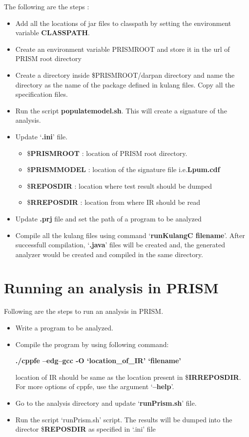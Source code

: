 \documentclass[11pt,a4paper,openright]{report}
\begin{document}
The following are the steps :
\begin{itemize}
 \item  Add all the locations of jar files to classpath by setting the environment variable \textbf{CLASSPATH}. 
 \item Create an environment variable PRISMROOT and store it in the url of PRISM root directory
 \item Create a directory inside \$PRISMROOT/darpan directory and name the directory as the name of the package defined in kulang 
 files. Copy all the specification files.
 \item Run the script \textbf{populatemodel.sh}. This will create a signature of the analysis.
 \item Update `\textbf{.ini}' file.
	\begin{itemize}
	 \item \$\textbf{PRISMROOT} : location of PRISM root directory.
	 \item \$\textbf{PRISMMODEL} : location of the signature file i.e.\textbf{Lpum.cdf}
	 \item \$\textbf{REPOSDIR} : location where test result should be dumped
	 \item \$\textbf{RREPOSDIR} : location from where IR should be read
	\end{itemize}
\item Update  \textbf{.prj} file and set the path of a program to be analyzed
\item Compile all the kulang files using command `\textbf{runKulangC filename}'. After successfull compilation, `\textbf{.java}' 
 files will be created and, the generated analyzer would be created and compiled in the same directory.
\end{itemize}

\section{Running an analysis in PRISM}
Following are the steps to run an analysis in PRISM.
\begin{itemize}
 \item Write a program to be analyzed.
 \item Compile the program by using following command:
 
 \textbf{./cppfe --edg--gcc -O `location\_of\_IR' `filename' }
 
 location of IR should be same as the location present in \$\textbf{IRREPOSDIR}. For more options of cppfe, use the argument 
 `\textbf{--help}'.
 
 \item Go to the analysis directory and update `\textbf{runPrism.sh}' file. 
 \item Run the script `runPrism.sh' script. The results will be dumped into the director \$\textbf{REPOSDIR} as specified in `.ini' file
 \end{itemize}
\end{document}
